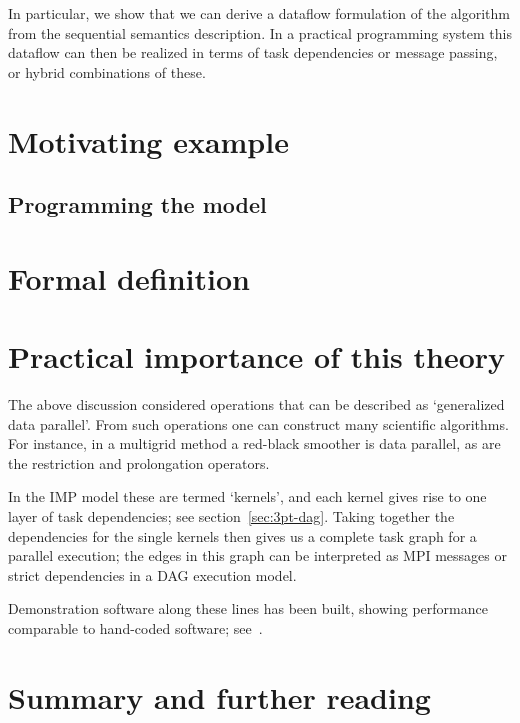 \documentclass[11pt,fleqn,preprint]{impreport}
\begin{document}
In particular, we show that we can derive a dataflow formulation of
the algorithm from the sequential semantics description. In a
practical programming system this dataflow can then be realized in
terms of task dependencies or message passing, or hybrid combinations
of these.

\section{Motivating example}
\label{sec:threepoint-example}

\subsection{Programming the model}


\section{Formal definition}


\section{Practical importance of this theory}

The above discussion considered operations that can be described as
`generalized data parallel'. From such operations one can construct
many scientific algorithms. For instance, in a multigrid method a
red-black smoother is data parallel, as are the restriction and
prolongation operators.

In the \ac{IMP} model these are termed `kernels', and each kernel
gives rise to one layer of task dependencies; see
section~\ref{sec:3pt-dag}.
Taking together the dependencies for the single kernels
then gives us a complete task graph for a parallel execution;
the edges in this graph can be interpreted as MPI messages
or strict dependencies in a \ac{DAG} execution model.

Demonstration software along these lines has been built, showing
performance comparable to hand-coded software; see~\cite{IMP-19}.

\section{Summary and further reading}
\end{document}
